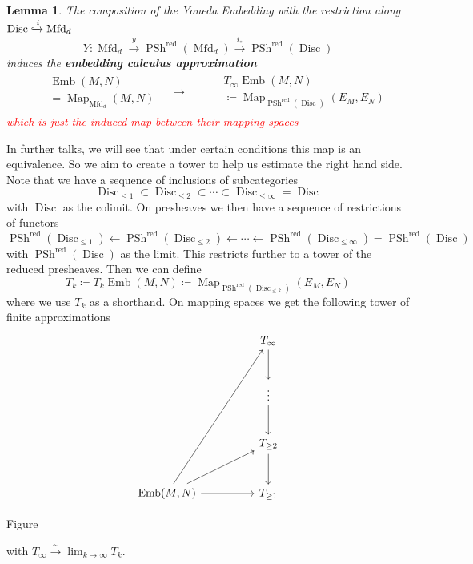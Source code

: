 \documentclass{amsart}
\DeclareMathOperator{\Emb}{Emb}
\DeclareMathOperator{\Mfd}{Mfd}
\DeclareMathOperator{\red}{red}
\DeclareMathOperator{\Map}{Map}
\DeclareMathOperator{\Disc}{Disc}
\DeclareMathOperator{\Psh}{PSh}
\newtheorem{lemma}[theorem]{Lemma}
\theoremstyle{definition}
\theoremstyle{remark}
\theoremstyle{example}
\begin{document}
\begin{lemma}
    The composition of the Yoneda Embedding with the restriction along $\Disc \xhookrightarrow{i} \Mfd_d$ 
    \[
    Y \colon \Mfd_d \xrightarrow{y} \Psh^{\red}(\Mfd_d) \xrightarrow{i_*} \Psh^{\red}(\Disc)
    \]
    induces the \textbf{embedding calculus approximation}
    \[
    \begin{aligned}
        &\begin{aligned}
            &\Emb(M,N) \\
            &= \Map_{\Mfd_d}(M,N)
        \end{aligned}
        \quad \longrightarrow \qquad
        \begin{aligned}
            &T_{\infty}\Emb(M,N) \\
            &\coloneq  \Map_{\Psh^{\red}(\Disc)}(E_M,E_N)
        \end{aligned}
    \end{aligned}
    \]
    \textcolor{red}{which is just the induced map between their mapping spaces}
\end{lemma}
In further talks, we will see that under certain conditions this map is an equivalence. So we aim to create a tower to help us estimate the right hand side. Note that we have a sequence of inclusions of subcategories
\[
\Disc_{\leq 1} \subset \Disc_{\leq 2} \subset \cdots \subset \Disc_{\leq \infty} = \Disc
\]
with $\Disc$ as the colimit. On presheaves we then have a sequence of restrictions of functors
\[
\Psh^{\red}({\Disc_{\leq 1}}) \leftarrow \Psh^{\red}({\Disc_{\leq 2}}) \leftarrow \cdots \leftarrow \Psh^{\red}({\Disc_{\leq \infty}}) = \Psh^{\red}({\Disc})
\]
with $\Psh^{\red}({\Disc})$ as the limit. This restricts further to a tower of the reduced presheaves. Then we can define 
\[
T_{k} \coloneq T_{k}\Emb(M,N) \coloneq \Map_{\Psh^{\red}(\Disc_{\leq k})}(E_M,E_N)
\]
where we use $T_{k}$ as a shorthand. On mapping spaces we get the following tower of finite approximations 
\[
\begin{tikzcd}[row sep=large, column sep=huge]
    & T_{\infty} \arrow[d] \\
    & \vdots \arrow[d] \\
    & T_{\geq 2} \arrow[d] \\
    \Emb(M,N) \arrow[r] \arrow[ur] \arrow[uuur] & T_{\geq 1}
\end{tikzcd}
\]
\begin{center}
\label{fig:embedding-calculus-tower}
Figure~\thefigure
\end{center}
with $T_{\infty} \xrightarrow{\sim} \lim_{k \rightarrow \infty} T_{k}$. 
\end{document}
